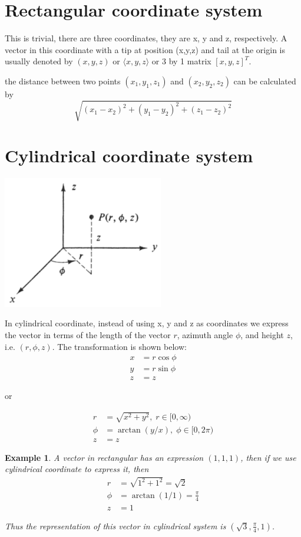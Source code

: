 \documentclass{article}
\newtheorem{ex}{Example}
\begin{document}
\section{Rectangular coordinate system}
This is trivial, there are three coordinates, they are x, y and z, respectively. A vector in this coordinate with a tip at position (x,y,z) and tail at the origin is usually denoted by $(x,y,z)$ or $\langle x,y,z \rangle$ or 3 by 1 matrix $[x,y,z]^T$.

the distance between two points $(x_1,y_1,z_1)$ and $(x_2,y_2,z_2)$ can be calculated by 
\[  \sqrt{(x_1-x_2)^2+(y_1-y_2)^2+(z_1-z_2)^2} \]


\section{Cylindrical coordinate system}
\begin{center}
	\includegraphics*[width=7cm]{cylindrical-coordinates.png}
\end{center}

In cylindrical coordinate, instead of using x, y and z as coordinates we express the vector in terms of the length of the vector $r$, azimuth angle $\phi$, and height $z$, i.e. $(r,\phi,z)$. The transformation is shown below:  
\begin{align*}
x &= r\cos\phi \\
y &= r\sin\phi\\
z &= z
\end{align*}

or 

\begin{align*}
r &= \sqrt{x^2+y^2},\; r\in[0,\infty)\\
\phi &= \arctan(y/x),\; \phi\in[0,2\pi)\\
z &= z
\end{align*}

\begin{ex}
	A vector in rectangular has an expression $(1,1,1)$, then if we use cylindrical coordinate to express it, then
	\begin{align*}
	r &= \sqrt{1^2+1^2} = \sqrt{2}\\
	\phi &= \arctan(1/1) = \frac{\pi}{4}\\
	z &= 1
	\end{align*}
	
	Thus the representation of this vector in cylindrical system is $(\sqrt{3},\frac{\pi}{4},1)$. 
\end{ex}
\end{document}
